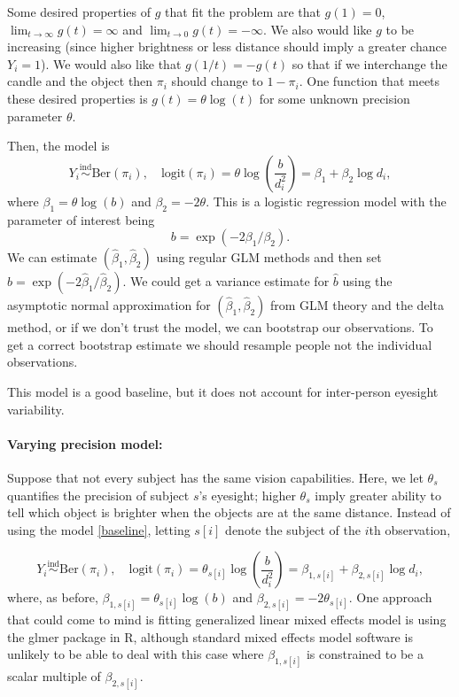 Some desired properties of $g$ that fit the problem are that $g(1)=0$, $\lim_{t \to \infty} g(t) =\infty$ and $\lim_{t \to 0} g(t)=-\infty$. We also would like $g$ to be increasing (since higher brightness or less distance should imply a greater chance $Y_i=1$). We would also like that $g(1/t)=-g(t)$ so that if we interchange the candle and the object then $\pi_i$ should change to $1-\pi_i$. One function that meets these desired properties is $g(t)=\theta \log (t)$ for some unknown precision parameter $\theta$.


Then, the model is
\begin{equation}
Y_i \overset{\text{ind}}\sim \text{Ber}(\pi_i), \quad \mathrm{logit}(\pi_i) = \theta\log\left(\frac{b}{d_i^2}\right) = \beta_1 + \beta_2 \log d_i,
\label{baseline}
\end{equation}
where $\beta_1 = \theta\log(b)$ and $\beta_2 = -2\theta$. This is a logistic regression model with the parameter of interest being
\begin{equation*}
b = \exp(-2\beta_1/\beta_2).
\end{equation*}
We can estimate $(\hat \beta_1, \hat \beta_2)$ using regular GLM methods and then set $\hat b = \exp(-2\hat \beta_1/\hat \beta_2)$. We could get a variance estimate for $\hat b$ using the asymptotic normal approximation for $(\hat \beta_1, \hat \beta_2)$ from GLM theory and the delta method, or if we don't trust the model, we can bootstrap our observations. To get a correct bootstrap estimate we should resample people not the individual observations. 

This model is a good baseline, but it does not account for inter-person eyesight variability.
 
\paragraph{Varying precision model:} Suppose that not every subject has the same vision capabilities. Here, we let $\theta_s$ quantifies the precision of subject $s$'s eyesight; higher $\theta_s$ imply greater ability to tell which object is brighter when the objects are at the same distance. Instead of using the model \eqref{baseline}, letting $s[i]$ denote the subject of the $i$th observation,

\begin{equation*}
Y_i \overset{\text{ind}}\sim \text{Ber}(\pi_i), \quad \text{logit}(\pi_i) = \theta_{s[i]} \log\left(\frac{b}{d_i^2}\right) = \beta_{1,s[i]} + \beta_{2,s[i]} \log d_i,
\label{varying}
\end{equation*}
where, as before, $\beta_{1,s[i]} = \theta_{s[i]}\log(b)$ and $\beta_{2,s[i]} = -2\theta_{s[i]}$. One approach that could come to mind is fitting generalized linear mixed effects model is using the glmer package in R, although standard mixed effects model software is unlikely to be able to deal with this case where $ \beta_{1,s[i]}$ is constrained to be a scalar multiple of $\beta_{2,s[i]}$. 

